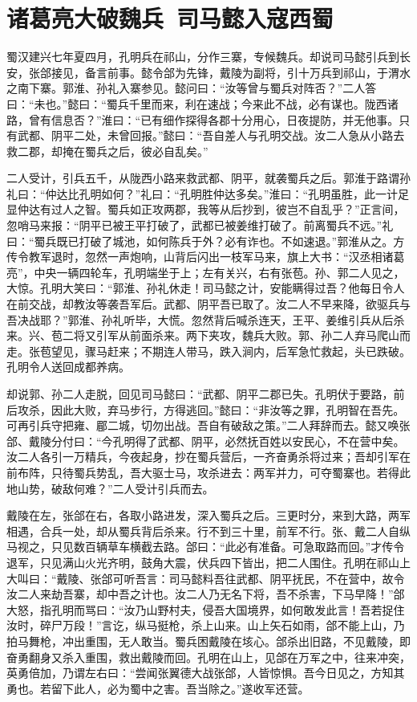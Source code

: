 \chapter{诸葛亮大破魏兵~司马懿入寇西蜀}

蜀汉建兴七年夏四月，孔明兵在祁山，分作三寨，专候魏兵。却说司马懿引兵到长安，张郃接见，备言前事。懿令郃为先锋，戴陵为副将，引十万兵到祁山，于渭水之南下寨。郭淮、孙礼入寨参见。懿问曰：“汝等曾与蜀兵对阵否？”二人答曰：“未也。”懿曰：“蜀兵千里而来，利在速战；今来此不战，必有谋也。陇西诸路，曾有信息否？”淮曰：“已有细作探得各郡十分用心，日夜提防，并无他事。只有武都、阴平二处，未曾回报。”懿曰：“吾自差人与孔明交战。汝二人急从小路去救二郡，却掩在蜀兵之后，彼必自乱矣。”

二人受计，引兵五千，从陇西小路来救武都、阴平，就袭蜀兵之后。郭淮于路谓孙礼曰：“仲达比孔明如何？”礼曰：“孔明胜仲达多矣。”淮曰：“孔明虽胜，此一计足显仲达有过人之智。蜀兵如正攻两郡，我等从后抄到，彼岂不自乱乎？”正言间，忽哨马来报：“阴平已被王平打破了，武都已被姜维打破了。前离蜀兵不远。”礼曰：“蜀兵既已打破了城池，如何陈兵于外？必有诈也。不如速退。”郭淮从之。方传令教军退时，忽然一声炮响，山背后闪出一枝军马来，旗上大书：“汉丞相诸葛亮”，中央一辆四轮车，孔明端坐于上；左有关兴，右有张苞。孙、郭二人见之，大惊。孔明大笑曰：“郭淮、孙礼休走！司马懿之计，安能瞒得过吾？他每日令人在前交战，却教汝等袭吾军后。武都、阴平吾已取了。汝二人不早来降，欲驱兵与吾决战耶？”郭淮、孙礼听毕，大慌。忽然背后喊杀连天，王平、姜维引兵从后杀来。兴、苞二将又引军从前面杀来。两下夹攻，魏兵大败。郭、孙二人弃马爬山而走。张苞望见，骤马赶来；不期连人带马，跌入涧内，后军急忙救起，头已跌破。孔明令人送回成都养病。

却说郭、孙二人走脱，回见司马懿曰：“武都、阴平二郡已失。孔明伏于要路，前后攻杀，因此大败，弃马步行，方得逃回。”懿曰：“非汝等之罪，孔明智在吾先。可再引兵守把雍、郿二城，切勿出战。吾自有破敌之策。”二人拜辞而去。懿又唤张郃、戴陵分付曰：“今孔明得了武都、阴平，必然抚百姓以安民心，不在营中矣。汝二人各引一万精兵，今夜起身，抄在蜀兵营后，一齐奋勇杀将过来；吾却引军在前布阵，只待蜀兵势乱，吾大驱士马，攻杀进去：两军并力，可夺蜀寨也。若得此地山势，破敌何难？”二人受计引兵而去。

戴陵在左，张郃在右，各取小路进发，深入蜀兵之后。三更时分，来到大路，两军相遇，合兵一处，却从蜀兵背后杀来。行不到三十里，前军不行。张、戴二人自纵马视之，只见数百辆草车横截去路。郃曰：“此必有准备。可急取路而回。”才传令退军，只见满山火光齐明，鼓角大震，伏兵四下皆出，把二人围住。孔明在祁山上大叫曰：“戴陵、张郃可听吾言：司马懿料吾往武都、阴平抚民，不在营中，故令汝二人来劫吾寨，却中吾之计也。汝二人乃无名下将，吾不杀害，下马早降！”郃大怒，指孔明而骂曰：“汝乃山野村夫，侵吾大国境界，如何敢发此言！吾若捉住汝时，碎尸万段！”言讫，纵马挺枪，杀上山来。山上矢石如雨，郃不能上山，乃拍马舞枪，冲出重围，无人敢当。蜀兵困戴陵在垓心。郃杀出旧路，不见戴陵，即奋勇翻身又杀入重围，救出戴陵而回。孔明在山上，见郃在万军之中，往来冲突，英勇倍加，乃谓左右曰：“尝闻张翼德大战张郃，人皆惊惧。吾今日见之，方知其勇也。若留下此人，必为蜀中之害。吾当除之。”遂收军还营。

